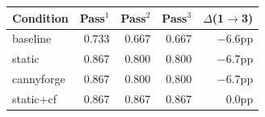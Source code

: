 \begin{tabular}{lrrrr}
\toprule
Condition & Pass$^1$ & Pass$^2$ & Pass$^3$ & $\Delta$(1$\rightarrow$3) \\
\midrule
baseline  & 0.733 & 0.667 & 0.667 & $-$6.6pp \\
static    & 0.867 & 0.800 & 0.800 & $-$6.7pp \\
cannyforge & 0.867 & 0.800 & 0.800 & $-$6.7pp \\
static$+$cf & 0.867 & 0.867 & 0.867 & 0.0pp \\
\bottomrule
\end{tabular}
